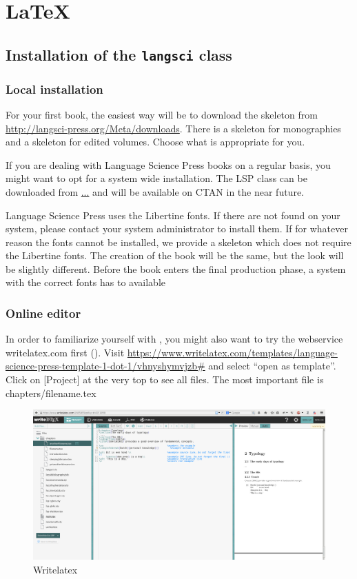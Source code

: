 \chapter{\LaTeX}

\section{Installation of the \texttt{langsci} class}
\subsection{Local installation}
For your first book, the easiest way will be to download the skeleton from \url{http://langsci-press.org/Meta/downloads}.
There is a skeleton for monographies and a skeleton for edited volumes. Choose what is appropriate for you.


If you are dealing with Language Science Press books on a regular basis, you might want to opt for a system wide installation. The LSP class can be downloaded from \url{...} and will be available on CTAN in the near future.

Language Science Press uses the Libertine fonts. If there are not found on your system, please contact your system administrator to install them. If for whatever reason the fonts cannot be installed, we provide a skeleton which does not require the Libertine fonts. The creation of the book will be the same, but the look will be slightly different. Before the book enters the final production phase, a system with the correct fonts has to available 

\subsection{Online editor}
In order to familiarize yourself with \latex, you might also want to try the webservice writelatex.com first (). Visit \url{https://www.writelatex.com/templates/language-science-press-template-1-dot-1/vhnyshymvjzb#} and select ``open as template''. Click on [Project] at the very top to see all files. The most important file is chapters/filename.tex

\begin{figure}
 \includegraphics[width=\textwidth]{writelatex.png}
  \caption{Writelatex}
  \label{fig:latex:writelatex}
\end{figure}


